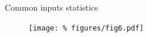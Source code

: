 \begin{frame}{Common inputs statistics}

  \begin{figure}
    \centering
    \texttt{[image: \%
      figures/fig6.pdf]} %
  \end{figure}  
  
\end{frame}
